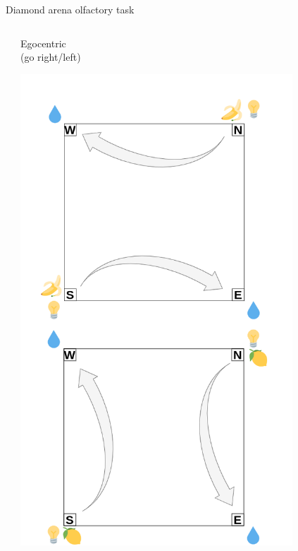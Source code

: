 \documentclass[bigger]{beamer}
\begin{document}
\begin{frame}[label={sec:orgc09b37b}]{Diamond arena olfactory task}
\begin{columns}
\begin{column}[t]{0.5\columnwidth}
\begin{center}
\end{center}
\end{column}
\begin{column}[t]{0.5\columnwidth}
\center
\vspace{-2em}
Egocentric\\
(go right/left)
\vspace{-2em}
\begin{center}
\includegraphics[width=0.8\textwidth]{img/RL_env-ego-task.drawio.png}
\end{center}
\end{column}
\end{columns}
\end{frame}
\end{document}
